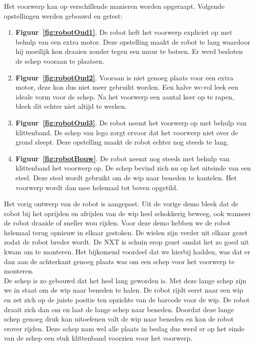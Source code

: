 \documentclass[tt3]{penoverslag}
\begin{document}
Het voorwerp kan op verschillende manieren worden opgeraapt. Volgende opstellingen werden gebouwd en getest:

\begin{enumerate}
\item \textbf{Figuur~\ref{fig:robotOud1}}. De robot heft het voorwerp expliciet op met behulp van een extra motor. Deze opstelling maakt de robot te lang waardoor hij moeilijk kon draaien zonder tegen een muur te botsen. Er werd besloten de schep vooraan te plaatsen.
\item \textbf{Figuur~\ref{fig:robotOud2}}. Vooraan is niet genoeg plaats voor een extra motor, deze kon dus niet meer gebruikt worden. Een halve wc-rol leek een ideale vorm voor de schep. Na het voorwerp een aantal keer op te rapen, bleek dit echter niet altijd te werken.
\item \textbf{Figuur~\ref{fig:robotOud3}}. De robot neemt het voorwerp op met behulp van klittenband. De schep van lego zorgt ervoor dat het voorwerp niet over de grond sleept. Deze opstelling maakt de robot echter nog steeds te lang.
\item \textbf{Figuur~\ref{fig:robotBouw}}. De robot neemt nog steeds met behulp van klittenband het voorwerp op. De schep bevind zich nu op het uiteinde van een steel. Deze steel wordt gebruikt om de wip naar beneden te kantelen. Het voorwerp wordt dan mee helemaal tot boven opgetild.  %
\end{enumerate}


Het vorig ontwerp van de robot is aangepast. Uit de vorige demo bleek dat de robot bij het oprijden en afrijden van de wip heel schokkerig beweeg, ook wanneer de robot draaide of sneller wou rijden. Voor deze demo hebben we de robot helemaal terug opnieuw in elkaar gestoken. De wielen zijn verder uit elkaar gezet zodat de robot breder wordt. De NXT is schuin erop gezet omdat het zo goed uit kwam om te monteren. Het bijkomend voordeel dat we hierbij hadden, was dat er dan aan de achterkant genoeg plaats was om een schep voor het voorwerp te monteren. \\

De schep is zo gebouwd dat het heel lang geworden is. Met deze lange schep zijn we in staat om de wip naar beneden te halen. De robot rijdt eerst naar een wip en zet zich op de juiste positie ten opzichte van de barcode voor de wip. De robot draait zich dan om en laat de lange schep naar beneden. Doordat deze lange schep genoeg druk kan uitoefenen valt de wip naar beneden en kan de robot erover rijden. Deze schep nam wel alle plaats in beslag dus werd er op het einde van de schep een stuk klittenband voorzien voor het voorwerp. \\
\end{document}
